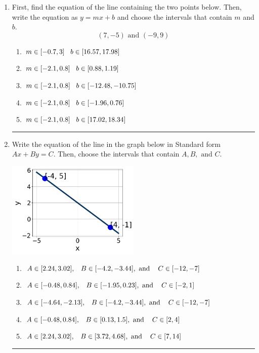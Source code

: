 \documentclass[14pt]{extbook}
\newcommand{\litem}[1]{\item#1\hspace*{-1cm}\rule{\textwidth}{0.4pt}}
\begin{document}
\begin{enumerate}
{\begin{enumerate}[label=\Alph*.]
\end{enumerate} }
\litem{
First, find the equation of the line containing the two points below. Then, write the equation as $ y=mx+b $ and choose the intervals that contain $m$ and $b$.\[ (7, -5) \text{ and } (-9, 9) \]\begin{enumerate}[label=\Alph*.]
\item \( m \in [-0.7, 3] \hspace*{3mm} b \in [16.57, 17.98] \)
\item \( m \in [-2.1, 0.8] \hspace*{3mm} b \in [0.88, 1.19] \)
\item \( m \in [-2.1, 0.8] \hspace*{3mm} b \in [-12.48, -10.75] \)
\item \( m \in [-2.1, 0.8] \hspace*{3mm} b \in [-1.96, 0.76] \)
\item \( m \in [-2.1, 0.8] \hspace*{3mm} b \in [17.02, 18.34] \)

\end{enumerate} }
\litem{
Write the equation of the line in the graph below in Standard form $Ax+By=C$. Then, choose the intervals that contain $A, B, \text{ and } C$.
\begin{center}
    \includegraphics[width=0.5\textwidth]{../Figures/linearGraphToStandardC.png}
\end{center}
\begin{enumerate}[label=\Alph*.]
\item \( A \in [2.24, 3.02], \hspace{3mm} B \in [-4.2, -3.44], \text{ and } \hspace{3mm} C \in [-12, -7] \)
\item \( A \in [-0.48, 0.84], \hspace{3mm} B \in [-1.95, 0.23], \text{ and } \hspace{3mm} C \in [-2, 1] \)
\item \( A \in [-4.64, -2.13], \hspace{3mm} B \in [-4.2, -3.44], \text{ and } \hspace{3mm} C \in [-12, -7] \)
\item \( A \in [-0.48, 0.84], \hspace{3mm} B \in [0.13, 1.5], \text{ and } \hspace{3mm} C \in [2, 4] \)
\item \( A \in [2.24, 3.02], \hspace{3mm} B \in [3.72, 4.68], \text{ and } \hspace{3mm} C \in [7, 14] \)


\end{enumerate}}
\end{enumerate}
\end{document}
